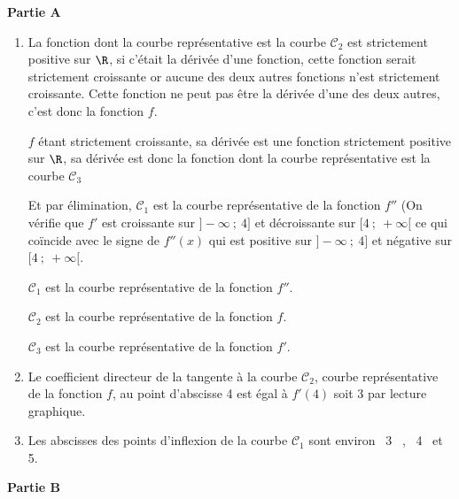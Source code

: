 \bigskip

\textbf{Partie A}

\begin{enumerate}

\item La fonction dont la courbe représentative est la courbe $\mathcal{C}_2$ est strictement positive sur $\R$, si c'était la dérivée d'une fonction, cette fonction serait strictement croissante or aucune des deux autres fonctions n'est strictement croissante. Cette fonction ne peut pas être la dérivée d'une des deux autres,  c'est donc la fonction $f$.

$f$ étant strictement croissante, sa dérivée est une fonction strictement positive sur $\R$, sa dérivée est donc la fonction dont la courbe représentative est la courbe $\mathcal{C}_3$

Et par élimination, $\mathcal{C}_1$  est la courbe représentative de la fonction $f''$ 
(On vérifie que $f'$ est croissante sur $]-\infty~;~ 4]$ et  décroissante sur $[4~;~+\infty[$ ce qui coïncide avec le signe de $f''(x)$ qui est positive sur $]-\infty~;~4]$ et négative sur $[4~;~+\infty[$.

$\mathcal{C}_1$  est la courbe représentative de la fonction $f''$.

$\mathcal{C}_2$ est la courbe représentative de la fonction $f$.

$\mathcal{C}_3$ est la courbe représentative de la fonction $f'$.

\item Le coefficient directeur de la  tangente à la courbe $\mathcal{C}_2$, courbe représentative de la fonction $f$, au point d'abscisse 4 est égal à $f'(4)$ soit 3 par lecture graphique.
\item  Les abscisses des points d'inflexion de la courbe $\mathcal{C}_1$ sont  environ \, 3 \, , \, 4 \, et \, 5.
\end{enumerate}

\medskip

\textbf{Partie B}

\medskip

